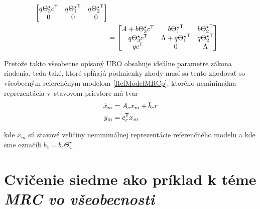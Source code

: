 \documentclass[a4paper, 10pt, ]{article}
\begin{document}
\begin{equation}
\begin{split}
\begin{bmatrix}
			q \Theta_3^\star c^{\mathsf{T}} & q {\Theta_1^\star}^{\mathsf{T}} & q {\Theta_2^\star}^{\mathsf{T}} \\
			0 & 0 & 0
		\end{bmatrix} \\
		&=
		\begin{bmatrix}
             A +  b \Theta_3^\star c^{\mathsf{T}}&
	    	 b {\Theta_1^\star}^{\mathsf{T}} &
	    	 b {\Theta_2^\star}^{\mathsf{T}} \\
	    	 q \Theta_3^\star c^{\mathsf{T}} &
	    	 \Lambda + q {\Theta_1^\star}^{\mathsf{T}} &
	    	 q {\Theta_2^\star}^{\mathsf{T}} \\
	    	 q c^{\mathsf{T}} & 0 & \Lambda
	 	\end{bmatrix}
	\end{split}
\end{equation}

Pretože takto všeobecne opísaný URO obsahuje ideálne parametre zákona riadenia, teda také, ktoré spĺňajú podmienky zhody musí sa tento zhodovať so všeobecným referenčným modelom \eqref{RefModelMRCp}, ktorého neminimálna reprezentácia v~stavovom priestore má tvar
\begin{subequations} \label{vsNeminimalRMMRCp}
	\begin{align}
		\dot x_m &= A_c x_m + \overline{b}_c r \\
		y_m &= c_c^{\mathsf{T}} x_m
	\end{align}
\end{subequations}














kde $x_m$ sú stavové veličiny neminimálnej reprezentácie referenčného modelu a kde sme označili $\overline{b}_c = b_c \Theta_4^\star$.





















\section{Cvičenie siedme ako príklad k téme \emph{MRC vo všeobecnosti}}
\label{pkTMRC}
\end{document}

